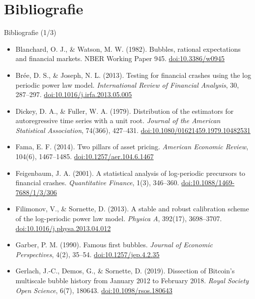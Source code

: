 \section{Bibliografie}

\begin{frame}{Bibliografie (1/3)}
\itemsize{\scriptsize}
\begin{itemize}
    \item Blanchard, O. J., \& Watson, M. W. (1982). Bubbles, rational expectations and financial markets. NBER Working Paper 945. \href{https://doi.org/10.3386/w0945}{doi:10.3386/w0945}
    \item Brée, D. S., \& Joseph, N. L. (2013). Testing for financial crashes using the log periodic power law model. \textit{International Review of Financial Analysis}, 30, 287--297. \href{https://doi.org/10.1016/j.irfa.2013.05.005}{doi:10.1016/j.irfa.2013.05.005}
    \item Dickey, D. A., \& Fuller, W. A. (1979). Distribution of the estimators for autoregressive time series with a unit root. \textit{Journal of the American Statistical Association}, 74(366), 427--431. \href{https://doi.org/10.1080/01621459.1979.10482531}{doi:10.1080/01621459.1979.10482531}
    \item Fama, E. F. (2014). Two pillars of asset pricing. \textit{American Economic Review}, 104(6), 1467--1485. \href{https://doi.org/10.1257/aer.104.6.1467}{doi:10.1257/aer.104.6.1467}
    \item Feigenbaum, J. A. (2001). A statistical analysis of log-periodic precursors to financial crashes. \textit{Quantitative Finance}, 1(3), 346--360. \href{https://doi.org/10.1088/1469-7688/1/3/306}{doi:10.1088/1469-7688/1/3/306}
    \item Filimonov, V., \& Sornette, D. (2013). A stable and robust calibration scheme of the log-periodic power law model. \textit{Physica A}, 392(17), 3698--3707. \href{https://doi.org/10.1016/j.physa.2013.04.012}{doi:10.1016/j.physa.2013.04.012}
    \item Garber, P. M. (1990). Famous first bubbles. \textit{Journal of Economic Perspectives}, 4(2), 35--54. \href{https://doi.org/10.1257/jep.4.2.35}{doi:10.1257/jep.4.2.35}
    \item Gerlach, J.-C., Demos, G., \& Sornette, D. (2019). Dissection of Bitcoin\textquoteright s multiscale bubble history from January 2012 to February 2018. \textit{Royal Society Open Science}, 6(7), 180643. \href{https://doi.org/10.1098/rsos.180643}{doi:10.1098/rsos.180643}
\end{itemize}
\end{frame}

